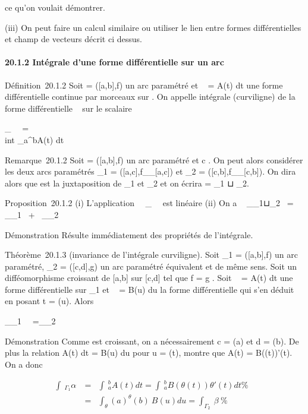 \documentclass[]{article}
\begin{document}
ce qu'on voulait démontrer.

(iii) On peut faire un calcul similaire ou utiliser le lien entre formes
différentielles et champ de vecteurs décrit ci dessus.

\paragraph{20.1.2 Intégrale d'une forme différentielle sur un arc}

Définition~20.1.2 Soit \Gamma = ([a,b],f) un arc paramétré et \alpha~ = A(t) dt
une forme différentielle continue par morceaux sur \Gamma. On appelle
intégrale (curviligne) de la forme différentielle \alpha~ sur \Gamma le scalaire

\int  _\Gamma~\alpha~ =\\int
 _a^bA(t) dt

Remarque~20.1.2 Soit \Gamma = ([a,b],f) un arc paramétré et c \in
[a,b]. On peut alors considérer les deux arcs paramétrés
\Gamma_1 = ([a,c],f__[a,c]) et
\Gamma_2 = ([c,b],f__[c,b]). On
dira alors que \Gamma est la juxtaposition de \Gamma_1 et \Gamma_2 et
on écrira \Gamma = \Gamma_1 ⊔ \Gamma_2.

Proposition~20.1.2 (i) L'application
\alpha~\mapsto~\int  _\Gamma~\alpha~
est linéaire (ii) On a \int ~
_\Gamma_1⊔\Gamma_2\alpha~ =\int ~
_\Gamma_1\alpha~ +\int ~
_\Gamma_2\alpha~

Démonstration Résulte immédiatement des propriétés de l'intégrale.

Théorème~20.1.3 (invariance de l'intégrale curviligne). Soit
\Gamma_1 = ([a,b],f) un arc paramétré, \Gamma_2 =
([c,d],g) un arc paramétré équivalent et de même sens. Soit \theta un
difféomorphisme croissant de [a,b] sur [c,d] tel que f = g \cdot \theta.
Soit \alpha~ = A(t) dt une forme différentielle sur \Gamma_1 et \beta~ = B(u)
du la forme différentielle qui s'en déduit en posant t = \theta(u). Alors

\int  _\Gamma_1~\alpha~
=\int  _\Gamma_2~\beta~

Démonstration Comme \theta est croissant, on a nécessairement c = \theta(a) et d =
\theta(b). De plus la relation A(t) dt = B(u) du pour u = \theta(t), montre que
A(t) = B(\theta(t))\theta'(t). On a donc

\begin{align*} \int ~
_\Gamma_1\alpha~& =& \int ~
_a^bA(t) dt =\int ~
_a^bB(\theta(t))\theta'(t) dt\%& \\
& =& \int  _\theta(a)^\theta(b)~B(u) du
=\int  _\Gamma_2~\beta~ \%&
\\ \end{align*}
\end{document}
